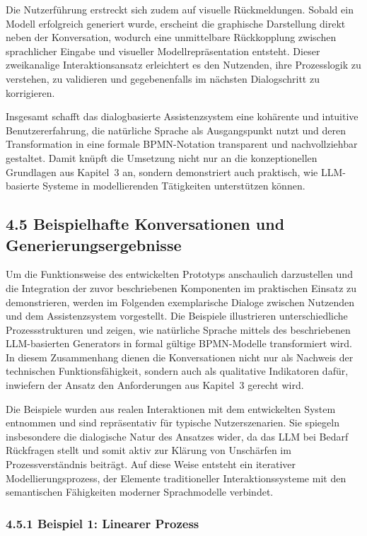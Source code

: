 \documentclass[a4paper,12pt]{scrreprt}
\begin{document}
Die Nutzerführung erstreckt sich zudem auf visuelle Rückmeldungen. Sobald ein Modell erfolgreich generiert wurde, erscheint die graphische Darstellung direkt neben der Konversation, wodurch eine unmittelbare Rückkopplung zwischen 
sprachlicher Eingabe und visueller Modellrepräsentation entsteht. Dieser zweikanalige Interaktionsansatz erleichtert es den Nutzenden, ihre Prozesslogik zu verstehen, zu validieren und gegebenenfalls im nächsten Dialogschritt zu korrigieren.

Insgesamt schafft das dialogbasierte Assistenzsystem eine kohärente und intuitive Benutzererfahrung, die natürliche Sprache als Ausgangspunkt nutzt und deren Transformation in eine formale BPMN-Notation transparent und nachvollziehbar gestaltet. Damit knüpft die Umsetzung nicht nur an die konzeptionellen Grundlagen aus Kapitel~3 an, sondern demonstriert auch praktisch, wie LLM-basierte Systeme in modellierenden Tätigkeiten unterstützen können.

\subsection*{4.5 Beispielhafte Konversationen und Generierungsergebnisse}

Um die Funktionsweise des entwickelten Prototyps anschaulich darzustellen und die Integration der zuvor beschriebenen Komponenten im praktischen Einsatz zu demonstrieren, werden im Folgenden exemplarische Dialoge zwischen Nutzenden und dem Assistenzsystem vorgestellt. Die Beispiele illustrieren unterschiedliche Prozessstrukturen und zeigen, wie natürliche Sprache mittels des beschriebenen LLM-basierten Generators in formal gültige BPMN-Modelle transformiert wird. In diesem Zusammenhang dienen die Konversationen nicht nur als Nachweis der technischen Funktionsfähigkeit, sondern auch als qualitative Indikatoren dafür, inwiefern der Ansatz den Anforderungen aus 
Kapitel~3 gerecht wird.

Die Beispiele wurden aus realen Interaktionen mit dem entwickelten System entnommen und sind repräsentativ für typische Nutzerszenarien. Sie spiegeln insbesondere die dialogische Natur des Ansatzes wider, da das LLM bei Bedarf Rückfragen stellt und somit aktiv zur Klärung von Unschärfen im Prozessverständnis beiträgt. Auf diese Weise entsteht ein iterativer Modellierungsprozess, der Elemente traditioneller Interaktionssysteme mit den semantischen Fähigkeiten moderner Sprachmodelle verbindet.

\subsubsection*{4.5.1 Beispiel 1: Linearer Prozess}
\end{document}
